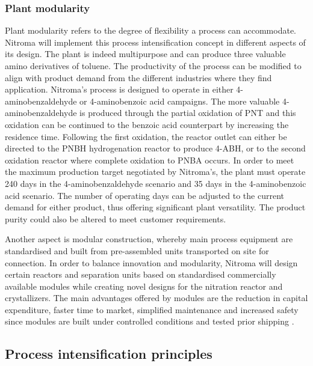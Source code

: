 \subsubsection{Plant modularity} 

Plant modularity refers to the degree of flexibility a process can accommodate. Nitroma will implement this process intensification concept in different aspects of its design. The plant is indeed multipurpose and can produce three valuable amino derivatives of toluene. The productivity of the process can be modified to align with product demand from the different industries where they find application. Nitroma's process is designed to operate in either 4-aminobenzaldehyde or 4-aminobenzoic acid campaigns. The more valuable 4-aminobenzaldehyde is produced through the partial oxidation of PNT and this oxidation can be continued to the benzoic acid counterpart by increasing the residence time. Following the first oxidation, the reactor outlet can either be directed to the PNBH hydrogenation reactor to produce 4-ABH, or to the second oxidation reactor where complete oxidation to PNBA occurs. In order to meet the maximum production target negotiated by Nitroma's, the plant must operate 240 days in the 4-aminobenzaldehyde scenario and 35 days in the 4-aminobenzoic acid scenario. The number of operating days can be adjusted to the current demand for either product, thus offering significant plant versatility. The product purity could also be altered to meet customer requirements.

Another aspect is modular construction, whereby main process equipment are standardised and built from pre-assembled units transported on site for connection. In order to balance innovation and modularity, Nitroma will design certain reactors and separation units based on standardised commercially available modules while creating novel designs for the nitration reactor and crystallizers. The main advantages offered by modules are the reduction in capital expenditure, faster time to market, simplified maintenance and increased safety since modules are built under controlled conditions and tested prior shipping \cite{baldea_modular_2017}.


\subsection{Process intensification principles}

